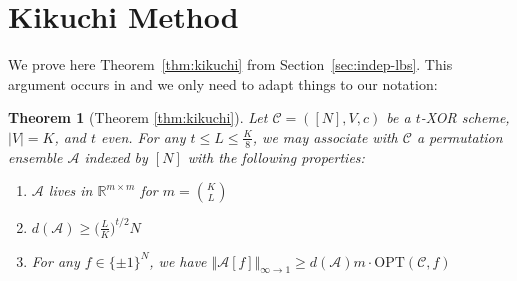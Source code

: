 \documentclass[11pt]{article}
\newtheorem{theorem}{Theorem}
\newcommand{\norm}[1]{\Vert #1 \Vert}
\newcommand{\Opt}{\mathrm{OPT}}
\newcommand{\N}{[N]}
\begin{document}
\section{Kikuchi Method}\label{app:kikuchi}
We prove here Theorem~\ref{thm:kikuchi} from Section~\ref{sec:indep-lbs}. This argument occurs in \cite{wein2019kikuchi,smoothed} and we only need to adapt things to our notation:
\begin{theorem}[Theorem \ref{thm:kikuchi}]
Let $\mathcal{C} = (\N,V,c)$ be a $t$-XOR scheme, $|V|=K$, and $t$ even. For any $t \leq L \leq \frac{K}{8}$, we may associate with $\mathcal{C}$ a permutation ensemble
$\mathcal{A}$ indexed by $\N$ with the following properties:
\begin{enumerate}
	\item $\mathcal{A}$ lives in $\mathbb{R}^{m \times m}$ for $m = \binom{K}{L}$
	\item $d(\mathcal{A}) \geq \bigl(\frac{L}{K}\bigr)^{t/2} N$
	\item For any $f\in \{\pm 1\}^N$, we have $\norm{\mathcal{A}[f]}_{\infty \to 1} \geq d(\mathcal{A}) m \cdot \Opt(\mathcal{C},f)$
\end{enumerate}
\end{theorem}
\end{document}
